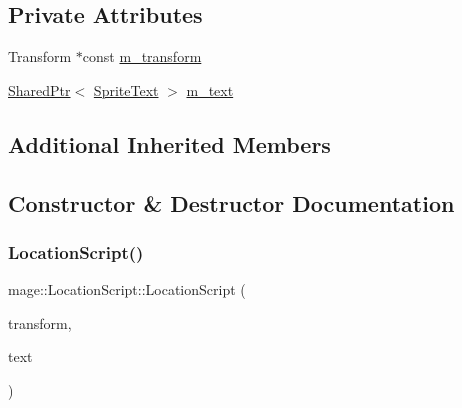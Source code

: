 \subsection*{Private Attributes}
\begin{DoxyCompactItemize}
\item 
Transform $\ast$const \hyperlink{classmage_1_1_location_script_aaa349c73ef4fc8267e6bd1cc0512cd5c}{m\+\_\+transform}
\item 
\hyperlink{namespacemage_a1e01ae66713838a7a67d30e44c67703e}{Shared\+Ptr}$<$ \hyperlink{classmage_1_1_sprite_text}{Sprite\+Text} $>$ \hyperlink{classmage_1_1_location_script_ac5c7ada3b364d85888686abf20cd6463}{m\+\_\+text}
\end{DoxyCompactItemize}
\subsection*{Additional Inherited Members}


\subsection{Constructor \& Destructor Documentation}
\hypertarget{classmage_1_1_location_script_a6ba4b1c4a698ab5ea0d7deb7ffa58bed}{}\label{classmage_1_1_location_script_a6ba4b1c4a698ab5ea0d7deb7ffa58bed} 
\subsubsection{\texorpdfstring{Location\+Script()}{LocationScript()}\hspace{0.1cm}{\footnotesize\ttfamily [1/3]}}
{\footnotesize\ttfamily mage\+::\+Location\+Script\+::\+Location\+Script (\begin{DoxyParamCaption}\item[{Transform $\ast$}]{transform,  }\item[{\hyperlink{namespacemage_a1e01ae66713838a7a67d30e44c67703e}{Shared\+Ptr}$<$ \hyperlink{classmage_1_1_sprite_text}{Sprite\+Text} $>$}]{text }\end{DoxyParamCaption})\hspace{0.3cm}{\ttfamily [explicit]}}

\hypertarget{classmage_1_1_location_script_a53fb0562896eadb4c747d53b53f65b40}{}\label{classmage_1_1_location_script_a53fb0562896eadb4c747d53b53f65b40} 
